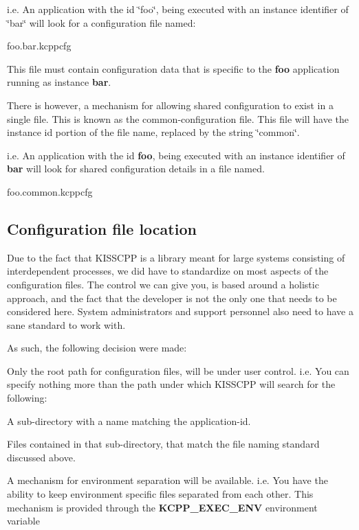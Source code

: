 i.\-e. An application with the id \char`\"{}foo\char`\"{}, being executed with an instance identifier of \char`\"{}bar\char`\"{} will look for a configuration file named\-:


\begin{DoxyCode}
foo.bar.kcppcfg
\end{DoxyCode}


This file must contain configuration data that is specific to the {\bfseries foo} application running as instance {\bfseries bar}.

There is however, a mechanism for allowing shared configuration to exist in a single file. This is known as the common-\/configuration file. This file will have the instance id portion of the file name, replaced by the string \char`\"{}common\char`\"{}.

i.\-e. An application with the id {\bfseries foo}, being executed with an instance identifier of {\bfseries bar} will look for shared configuration details in a file named.


\begin{DoxyCode}
foo.common.kcppcfg
\end{DoxyCode}


\subsection*{Configuration file location}

Due to the fact that K\-I\-S\-S\-C\-P\-P is a library meant for large systems consisting of interdependent processes, we did have to standardize on most aspects of the configuration files. The control we can give you, is based around a holistic approach, and the fact that the developer is not the only one that needs to be considered here. System administrators and support personnel also need to have a sane standard to work with.

As such, the following decision were made\-:


\begin{DoxyEnumerate}
\item Only the root path for configuration files, will be under user control. i.\-e. You can specify nothing more than the path under which K\-I\-S\-S\-C\-P\-P will search for the following\-:
\begin{DoxyItemize}
\item A sub-\/directory with a name matching the application-\/id.
\item Files contained in that sub-\/directory, that match the file naming standard discussed above.
\end{DoxyItemize}
\item A mechanism for environment separation will be available. i.\-e. You have the ability to keep environment specific files separated from each other. This mechanism is provided through the {\bfseries K\-C\-P\-P\-\_\-\-E\-X\-E\-C\-\_\-\-E\-N\-V} environment variable
\end{DoxyEnumerate}


